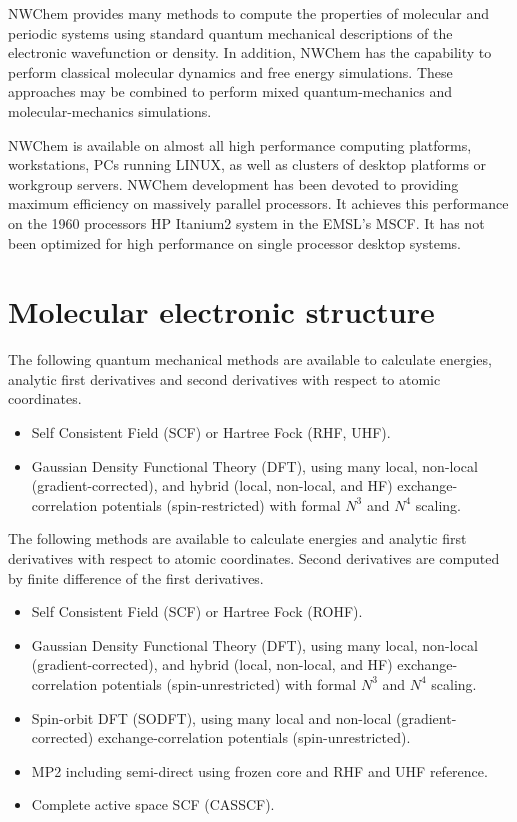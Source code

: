 %
%
\label{sec:functionality}

NWChem provides many methods to compute the properties of molecular and
periodic systems using standard quantum mechanical descriptions of the
electronic wavefunction or density.  In addition, NWChem has the
capability to perform classical molecular dynamics and free energy
simulations.  These approaches may be combined to perform mixed
quantum-mechanics and molecular-mechanics simulations. 

NWChem is available on almost all high performance computing platforms,
workstations, PCs running LINUX, as well as clusters of desktop platforms or
workgroup servers. NWChem development has been devoted to providing
maximum efficiency on massively parallel processors. It achieves this performance
on the 1960 processors HP Itanium2 system in the EMSL's MSCF.  
It has not been optimized for high performance on single processor desktop systems.

\section{Molecular electronic structure}

The following quantum mechanical methods are available to calculate
energies, analytic first derivatives and second derivatives with respect to atomic
coordinates.  

\begin{itemize}
\item Self Consistent Field (SCF) or Hartree Fock (RHF, UHF).
\item Gaussian Density Functional Theory (DFT), using many local,
  non-local (gradient-corrected), and hybrid (local, non-local, and HF)
exchange-correlation potentials 
(spin-restricted)
with formal $N^3$ and $N^4$ scaling.
\end{itemize}

The following methods are available to calculate energies and analytic
first derivatives with respect to atomic coordinates.  Second derivatives 
are computed by finite difference of the first derivatives.

\begin{itemize}
\item Self Consistent Field (SCF) or Hartree Fock (ROHF).  
\item Gaussian Density Functional Theory (DFT), using many local,
  non-local (gradient-corrected), and hybrid (local, non-local, and HF)
exchange-correlation potentials 
(spin-unrestricted)
with formal $N^3$ and $N^4$ scaling.
\item Spin-orbit DFT (SODFT), using many local and non-local (gradient-corrected)
exchange-correlation potentials (spin-unrestricted).
\item MP2 including semi-direct using frozen core and RHF and UHF reference.
\item Complete active space SCF (CASSCF).
\end{itemize}

